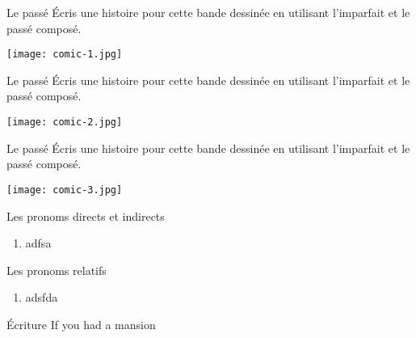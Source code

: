 \documentclass{beamer}
\begin{document}
  \begin{frame}[t]{Le passé}
    Écris une histoire pour cette bande dessinée en utilisant \alert{l'imparfait} et \alert{le passé composé}.
    \begin{center}
      \texttt{[image: comic-1.jpg]}
    \end{center}
  \end{frame}

  \begin{frame}[t]{Le passé}
    Écris une histoire pour cette bande dessinée en utilisant \alert{l'imparfait} et \alert{le passé composé}.
    \begin{center}
      \texttt{[image: comic-2.jpg]}
    \end{center}
  \end{frame}

  \begin{frame}[t]{Le passé}
    Écris une histoire pour cette bande dessinée en utilisant \alert{l'imparfait} et \alert{le passé composé}.
    \begin{center}
      \texttt{[image: comic-3.jpg]}
    \end{center}
  \end{frame}

  \begin{frame}{Les pronoms directs et indirects}
    \begin{enumerate}
      \item adfsa
    \end{enumerate}
  \end{frame}

  \begin{frame}{Les pronoms relatifs}
    \begin{enumerate}
      \item adsfda
    \end{enumerate}
  \end{frame}

  \begin{frame}{Écriture}
    If you had a mansion
  \end{frame}
\end{document}
